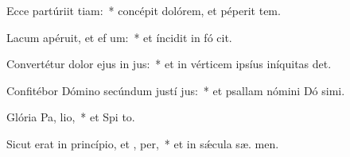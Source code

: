 \item Ecce partúriit tiam:~* concépit dolórem, et péperit tem.
\item Lacum apéruit, et ef um:~* et íncidit in fó  cit.
\item Convertétur dolor ejus in  jus:~* et in vérticem ipsíus iníquitas  det.
\item Confitébor Dómino secúndum justí jus:~* et psallam nómini Dó simi.
\item Glória Pa,  lio,~* et Spi to.
\item Sicut erat in princípio, et ,  per,~* et in sǽcula sæ. men.
